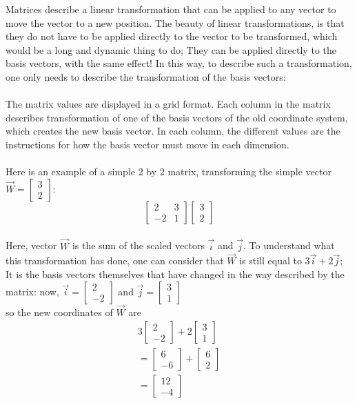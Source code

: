 \documentclass{article}
\begin{document}
Matrices describe a linear transformation that can be applied to any vector to move the vector to a new position. The beauty of linear transformations, is that they do not have to be applied directly to the vector to be transformed, which would be a long and dynamic thing to do; They can be applied directly to the basis vectors, with the same effect! In this way, to describe such a transformation, one only needs to describe the transformation of the basis vectors:
\\ \\
The matrix values are displayed in a grid format.
Each column in the matrix describes transformation of one of the basis vectors of the old coordinate system, which creates the new basis vector. In each column, the different values are the instructions for how the basis vector must move in each dimension.
\\ \\
Here is an example of a simple 2 by 2 matrix, transforming the simple vector $\vec{W} = \begin{bmatrix}
    3\\
    2
\end{bmatrix}$:
\[
\begin{bmatrix}
    2 & 3\\
    -2 & 1
\end{bmatrix}\begin{bmatrix}
    3\\
    2
\end{bmatrix}
\]
\\
Here, vector $\vec{W}$ is the sum of the scaled vectors $\vec{i}$ and $\vec{j}$. To understand what this transformation has done, one can consider that $\vec{W}$ is still equal to $3\vec{i} + 2\vec{j}$; It is the basis vectors themselves that have changed in the way described by the matrix:
now, $\vec{i} = \begin{bmatrix}
    2\\
    -2
\end{bmatrix}$ and $\vec{j} = \begin{bmatrix}
    3\\
    1
\end{bmatrix}$
\\
so the new coordinates of $\vec{W}$ are
\begin{align*}3\begin{bmatrix}2\\-2\end{bmatrix}+2\begin{bmatrix}3\\1\end{bmatrix}\\=\begin{bmatrix}6\\-6\end{bmatrix}+\begin{bmatrix}6\\2\end{bmatrix}\\=\begin{bmatrix}12\\ -4\end{bmatrix}\end{align*}
\end{document}
